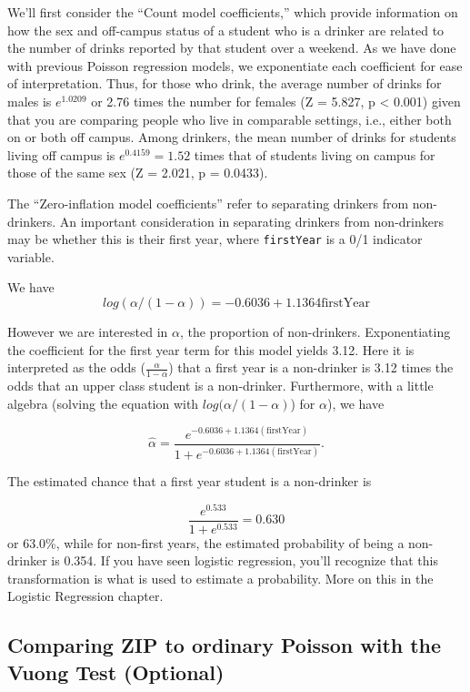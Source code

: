 \documentclass[
]{krantz}
\begin{document}
We'll first consider the ``Count model coefficients,'' which provide information on how the sex and off-campus status of a student who is a drinker are related to the number of drinks reported by that student over a weekend. As we have done with previous Poisson regression models, we exponentiate each coefficient for ease of interpretation. Thus, for those who drink, the average number of drinks for males is \(e^{1.0209}\) or 2.76 times the number for females (Z = 5.827, p \textless{} 0.001) given that you are comparing people who live in comparable settings, i.e., either both on or both off campus. Among drinkers, the mean number of drinks for students living off campus is \(e^{0.4159}=1.52\) times that of students living on campus for those of the same sex (Z = 2.021, p = 0.0433).

The ``Zero-inflation model coefficients'' refer to separating drinkers from non-drinkers. An important consideration in separating drinkers from non-drinkers may be whether this is their first year, where \texttt{firstYear} is a 0/1 indicator variable.

We have
\[ 
log(\alpha/(1-\alpha)) =-0.6036+1.1364\textrm{firstYear}
 \]

However we are interested in \(\alpha\), the proportion of non-drinkers. Exponentiating the coefficient for the first year term for this model yields 3.12. Here it is interpreted as the odds (\(\frac{\alpha}{1-\alpha}\)) that a first year is a non-drinker is 3.12 times the odds that an upper class student is a non-drinker. Furthermore, with a little algebra (solving the equation with \(log(\alpha/(1-\alpha)\)) for \(\alpha\)),
we have

\[
 \hat{\alpha} =
 \frac{e^ {-0.6036+1.1364(\textrm{firstYear})}}
 {1+e^{
 -0.6036+1.1364(\textrm{firstYear})
 }
 }.
 \]

The estimated chance that a first year student is a non-drinker is

\[
\frac{e^{0.533}}{1+e^{0.533}} = 0.630
\]
or 63.0\%, while for non-first years, the estimated probability of being a non-drinker is 0.354. If you have seen logistic regression, you'll recognize that this transformation is what is used to estimate a probability. More on this in the Logistic Regression chapter.

\hypertarget{comparing-zip-to-ordinary-poisson-with-the-vuong-test-optional}{%
\subsection{Comparing ZIP to ordinary Poisson with the Vuong Test (Optional)}\label{comparing-zip-to-ordinary-poisson-with-the-vuong-test-optional}}
\end{document}
